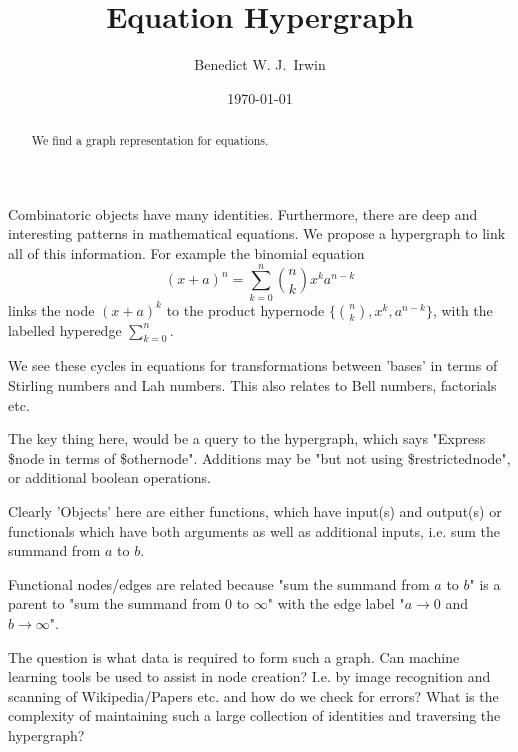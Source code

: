 \documentclass{article}
\title{Equation Hypergraph}
\date{\today}
\begin{document}

\author[1,2]{Benedict W. J.~Irwin}


\maketitle

\begin{abstract}
We find a graph representation for equations.
\end{abstract}

Combinatoric objects have many identities. Furthermore, there are deep and interesting patterns in mathematical equations. We propose a hypergraph to link all of this information. For example the binomial equation
$$
(x+a)^n = \sum_{k=0}^n \binom{n}{k} x^k a^{n-k}
$$
links the node $(x+a)^k$ to the product hypernode $\{ \binom{n}{k}, x^k, a^{n-k} \}$, with the labelled hyperedge $\sum_{k=0}^n$.

We see these cycles in equations for transformations between 'bases' in terms of Stirling numbers and Lah numbers. This also relates to Bell numbers, factorials etc.

The key thing here, would be a query to the hypergraph, which says "Express \$node in terms of \$othernode". Additions may be "but not using \$restrictednode", or additional boolean operations.

Clearly 'Objects' here are either functions, which have input(s) and output(s) or functionals which have both arguments as well as additional inputs, i.e. sum the summand from $a$ to $b$.

Functional nodes/edges are related because "sum the summand from $a$ to $b$" is a parent to "sum the summand from $0$ to $\infty$" with the edge label "$a\to0$ and $b \to \infty$".

The question is what data is required to form such a graph. Can machine learning tools be used to assist in node creation? I.e. by image recognition and scanning of Wikipedia/Papers etc. and how do we check for errors? What is the complexity of maintaining such a large collection of identities and traversing the hypergraph? 
\end{document}
